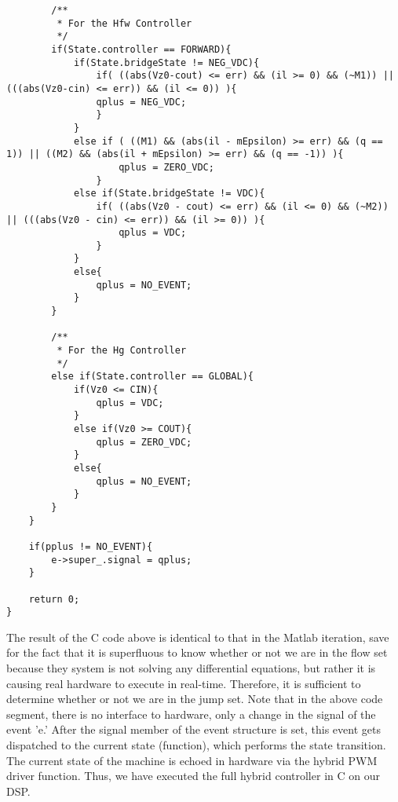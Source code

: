 \begin{lstlisting}
        /**
         * For the Hfw Controller
         */
        if(State.controller == FORWARD){    
            if(State.bridgeState != NEG_VDC){
                if( ((abs(Vz0-cout) <= err) && (il >= 0) && (~M1)) || (((abs(Vz0-cin) <= err)) && (il <= 0)) ){
                qplus = NEG_VDC;
                }
            }
            else if ( ((M1) && (abs(il - mEpsilon) >= err) && (q == 1)) || ((M2) && (abs(il + mEpsilon) >= err) && (q == -1)) ){
                    qplus = ZERO_VDC;
                }
            else if(State.bridgeState != VDC){
                if( ((abs(Vz0 - cout) <= err) && (il <= 0) && (~M2)) || (((abs(Vz0 - cin) <= err)) && (il >= 0)) ){
                    qplus = VDC;
                }
            }
            else{
                qplus = NO_EVENT;                
            }
        }

        /**
         * For the Hg Controller
         */
        else if(State.controller == GLOBAL){
            if(Vz0 <= CIN){
                qplus = VDC;
            }
            else if(Vz0 >= COUT){
                qplus = ZERO_VDC;
            }
            else{
                qplus = NO_EVENT;
            }
        }
    }

    if(pplus != NO_EVENT){
        e->super_.signal = qplus;
    }

    return 0;
}
\end{lstlisting}


The result of the C code above is identical to that in the Matlab iteration, save for the fact that it is superfluous to know whether or not we are in the flow set because they system is not solving any differential equations, but rather it is causing real hardware to execute in real-time.  Therefore, it is sufficient to determine whether or not we are in the jump set. Note that in the above code segment, there is no interface to hardware, only a change in the signal of the event 'e.' After the signal member of the event structure is set, this event gets dispatched to the current state (function), which performs the state transition. The current state of the machine is echoed in hardware via the hybrid PWM driver function. Thus, we have executed the full hybrid controller in C on our DSP. 
 



